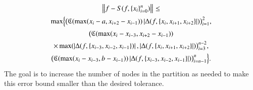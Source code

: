 \documentclass[review]{elsarticle}
\newcommand{\datasites}{\{x_i\}_{i=0}^n}
\begin{document}
\begin{multline} \label{appxerrbdb}
\norm{f - S(f,\datasites)} \le \\
\max \Bigl \{ \bigl(\fC(\max(x_i-a,x_{i+2}-x_{i-1}))\abs{\Delta(f,\{x_{i}, x_{i+1}, x_{i+2}\}}) \bigr)_{i=1}^2, \\
\bigl( \fC(\max(x_i-x_{i-3},x_{i+2}-x_{i-1}))\\
 \times \max(\abs{\Delta(f,\{x_{i-3}, x_{i-2}, x_{i-1}\})},\abs{\Delta(f,\{x_{i}, x_{i+1}, x_{i+2}\}}) \bigr)_{i=3}^{n-2}, \\
 \bigl(\fC(\max(x_i-x_{i-3},b-x_{i-1}))\abs{\Delta(f,\{x_{i-3}, x_{i-2}, x_{i-1}\}}) \bigr)_{i=n-1}^n \Bigr\}.
\end{multline}
The goal is to increase the number of nodes in the partition as needed to make this error bound smaller than the desired tolerance.
\end{document}
